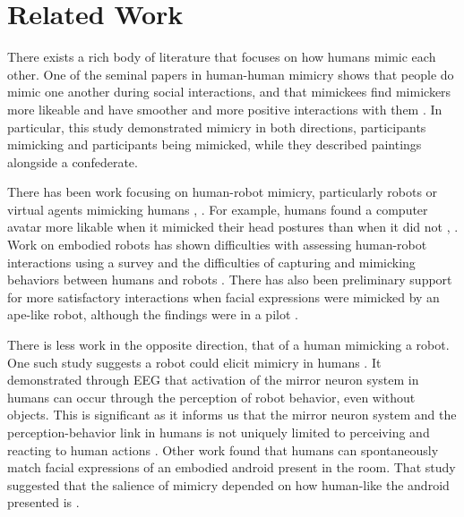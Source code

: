 \documentclass{acm_proc_article-sp}
\begin{document}
\section{Related Work}
There exists a rich body of literature that focuses on how humans mimic each other. One of the seminal papers in human-human mimicry shows that people do mimic one another during social interactions, and that mimickees find mimickers more likeable and have smoother and more positive interactions with them \cite{chartrand1999chameleon}. In particular, this study demonstrated mimicry in both directions, participants mimicking and participants being mimicked, while they described paintings alongside a confederate.

There has been work focusing on human-robot mimicry, particularly robots or virtual agents mimicking humans \cite{bailenson2005digital}, \cite{riek2010my}. For example, humans found a computer avatar more likable when it mimicked their head postures than when it did not \cite{bailenson2005digital}, \cite{chartrand2013antecedents}. Work on embodied robots has shown difficulties with assessing human-robot interactions using a survey and the difficulties of capturing and mimicking behaviors between humans and robots \cite{riek2010my}. There has also been preliminary support for more satisfactory interactions when facial expressions were mimicked by an ape-like robot, although the findings were in a pilot \cite{riek2008real}.

There is less work in the opposite direction, that of a human mimicking a robot. One such study suggests a robot could elicit mimicry in humans \cite{oberman2007eeg}. It demonstrated through EEG that activation of the mirror neuron system in humans can occur through the perception of robot behavior, even without objects. This is significant as it informs us that the mirror neuron system and the perception-behavior link in humans is not uniquely limited to perceiving and reacting to human actions \cite{oberman2007eeg}. Other work found that humans can spontaneously match facial expressions of an embodied android present in the room. That study suggested that the salience of mimicry depended on how human-like the android presented is \cite{hofree2014bridging}.
\end{document}
